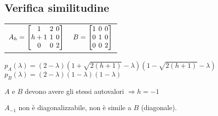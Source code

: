\subsection{Verifica similitudine}
\begin{tabular}{cc}
	$
	A_h = \left[
		\arraycolsep=2.0pt\def\arraystretch{1.0}
		\begin{array}{@{}ccc@{}}
			1   & 2 & 0 \\
			h+1 & 1 & 0 \\
			0   & 0 & 2 \\
		\end{array}
	\right]
	$ &
	$
	B = \left[
		\arraycolsep=2.0pt\def\arraystretch{1.0}
		\begin{array}{@{}ccc@{}}
			1 & 0 & 0 \\
			0 & 1 & 0 \\
			0 & 0 & 2 \\
		\end{array}
	\right]
	$
\end{tabular}

$p_A(\lambda) = (2-\lambda)(1+\sqrt{2(h+1)}-\lambda)(1-\sqrt{2(h+1)}-\lambda)$
$p_B(\lambda) = (2-\lambda)(1-\lambda)(1-\lambda)$

$A$ e $B$ devono avere gli stessi autovalori $\Rightarrow h = -1$

%

$A_{-1}$ non è diagonalizzabile, non è simile a $B$ (diagonale).
